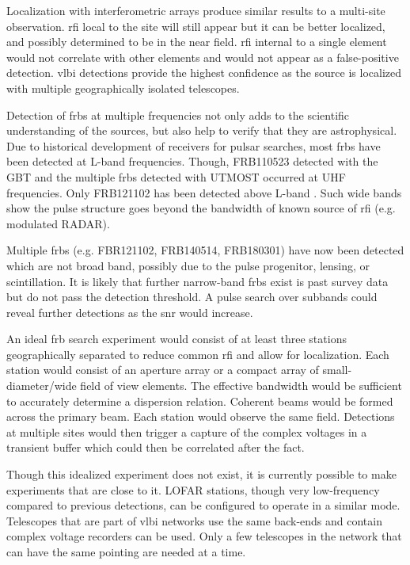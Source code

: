 \documentclass[a4paper,fleqn,usenatbib]{mnras}
\begin{document}
Localization with interferometric arrays produce similar results to a multi-site
observation. \gls{rfi} local to the site will still appear but it can be better
localized, and possibly determined to be in the near field. \gls{rfi} internal
to a single element would not correlate with other elements and would not appear
as a false-positive detection.  \gls{vlbi} detections provide the highest
confidence as the source is localized with multiple geographically isolated
telescopes.

Detection of \glspl{frb} at multiple frequencies not only adds to the scientific
understanding of the sources, but also help to verify that they are
astrophysical.  Due to historical development of receivers for pulsar searches,
most \glspl{frb} have been detected at L-band frequencies. Though, FRB110523
detected with the GBT and the multiple \glspl{frb} detected with UTMOST occurred
at UHF frequencies.  Only FRB121102 has been detected above L-band
\citep{atel10675}.  Such wide bands show the pulse structure goes beyond the
bandwidth of known source of \gls{rfi} (e.g. modulated RADAR). 

Multiple \glspl{frb} (e.g. FBR121102, FRB140514, FRB180301) have now been
detected which are not broad band, possibly due to the pulse progenitor,
lensing, or scintillation. It is likely that further narrow-band \glspl{frb}
exist is past survey data but do not pass the detection threshold. A pulse
search over subbands could reveal further detections as the \gls{snr} would
increase.

An ideal \gls{frb} search experiment would consist of at least three stations
geographically separated to reduce common \gls{rfi} and allow for localization.
Each station would consist of an aperture array or a compact array of
small-diameter/wide field of view elements. The effective bandwidth would be
sufficient to accurately determine a dispersion relation.  Coherent beams would
be formed across the primary beam. Each station would observe the same field.
Detections at multiple sites would then trigger a capture of the complex
voltages in a transient buffer which could then be correlated after the fact. 

Though this idealized experiment does not exist, it is currently possible to
make experiments that are close to it. LOFAR stations, though very low-frequency
compared to previous detections, can be configured to operate in a similar mode.
Telescopes that are part of \gls{vlbi} networks use the same back-ends and
contain complex voltage recorders can be used. Only a few telescopes in the
network that can have the same pointing are needed at a time.
\end{document}

